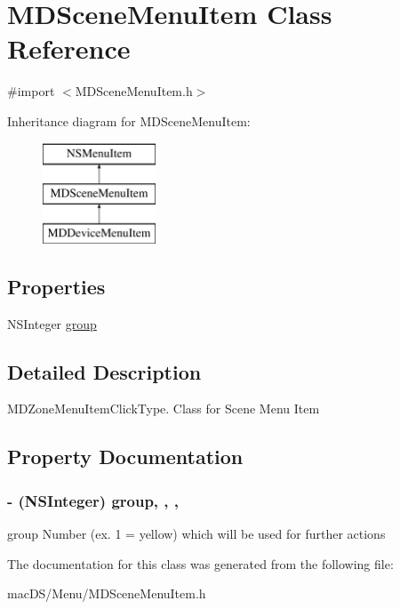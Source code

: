 \hypertarget{interface_m_d_scene_menu_item}{\section{M\-D\-Scene\-Menu\-Item Class Reference}
\label{interface_m_d_scene_menu_item}
}


{\ttfamily \#import $<$M\-D\-Scene\-Menu\-Item.\-h$>$}

Inheritance diagram for M\-D\-Scene\-Menu\-Item\-:\begin{figure}[H]
\begin{center}
\leavevmode
\includegraphics[height=3.000000cm]{interface_m_d_scene_menu_item}
\end{center}
\end{figure}
\subsection*{Properties}
\begin{DoxyCompactItemize}
\item 
N\-S\-Integer \hyperlink{interface_m_d_scene_menu_item_aa65f24d6bf8e466abdb0d32ee07b3c44}{group}
\end{DoxyCompactItemize}


\subsection{Detailed Description}
M\-D\-Zone\-Menu\-Item\-Click\-Type. Class for Scene Menu Item 

\subsection{Property Documentation}
\hypertarget{interface_m_d_scene_menu_item_aa65f24d6bf8e466abdb0d32ee07b3c44}{
\subsubsection[{group}]{\setlength{\rightskip}{0pt plus 5cm}-\/ (N\-S\-Integer) group\hspace{0.3cm}{\ttfamily [read]}, {\ttfamily [write]}, {\ttfamily [atomic]}, {\ttfamily [assign]}}}\label{interface_m_d_scene_menu_item_aa65f24d6bf8e466abdb0d32ee07b3c44}
group Number (ex. 1 = yellow) which will be used for further actions 

The documentation for this class was generated from the following file\-:\begin{DoxyCompactItemize}
\item 
mac\-D\-S/\-Menu/M\-D\-Scene\-Menu\-Item.\-h\end{DoxyCompactItemize}
